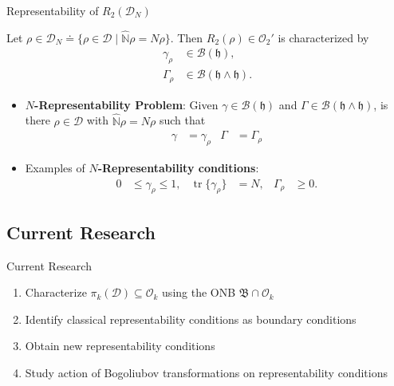 \documentclass{beamer}
\DeclareMathOperator{\tr}{tr}
\newcommand{\IN}{\ensuremath{\mathbb{N}}}
\newcommand{\HSbasis}{\mathfrak{B}}
\newcommand{\HilbertSpace}{\ensuremath{\mathfrak{h}}}
\newcommand{\DensityMatrices}{\mathcal{D}}
\newcommand{\kbOp}[1][k]{{\ensuremath{\mathcal{O}_{#1}}}}
\begin{document}
\begin{frame}{Representability of $R_2(\DensityMatrices_N)$}
    \begin{exampleblock}{}
        Let $\rho\in\DensityMatrices_N\doteq\{\rho\in\DensityMatrices\mid\hat{\IN}\rho=N\rho\}$. Then $R_2(\rho)\in\kbOp[2]'$
        is characterized by
        \begin{align}
            \gamma_\rho&\in\mathcal{B}(\HilbertSpace),\tag{1-RDM}\\
            \Gamma_\rho&\in\mathcal{B}(\HilbertSpace\wedge\HilbertSpace).\tag{2-RDM}
        \end{align}
    \end{exampleblock}
    \begin{itemize}
        \item \textbf{$N$-Representability Problem}: Given $\gamma\in\mathcal{B}(\HilbertSpace)$
        and $\Gamma\in\mathcal{B}(\HilbertSpace\wedge\HilbertSpace)$,  is there $\rho\in\DensityMatrices$ with $\hat{\IN}\rho=N\rho$ such that
            \begin{align}
                \gamma&=\gamma_\rho&\Gamma&=\Gamma_\rho
            \end{align}
        \item Examples of \textbf{$N$-Representability conditions}:
        \begin{equation}
            \begin{aligned}
                0&\le\gamma_\rho\le 1,&
                \tr\{\gamma_\rho\}&=N,&
                \Gamma_\rho&\ge 0.
            \end{aligned}
        \end{equation}
    \end{itemize}
\end{frame}

\subsection{Current Research}
\begin{frame}{Current Research}
    \begin{enumerate}
        \item Characterize $\pi_k(\DensityMatrices)\subseteq\kbOp$ using the ONB $\HSbasis\cap\kbOp$
        \item Identify classical representability conditions as boundary conditions
        \item Obtain new representability conditions
        \item Study action of Bogoliubov transformations on representability conditions
    \end{enumerate}
\end{frame}
\end{document}
